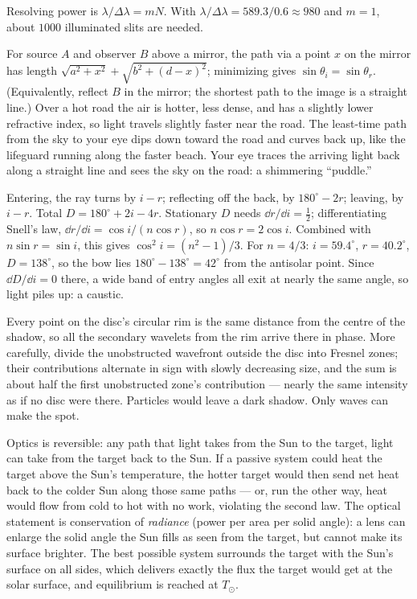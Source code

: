  Resolving power is $\lambda/\Delta\lambda = mN$. With $\lambda/\Delta\lambda = 589.3/0.6\approx980$ and $m = 1$, about $1000$ illuminated slits are needed.

 For source $A$ and observer $B$ above a mirror, the path via a point $x$ on the mirror has length $\sqrt{a^2+x^2} + \sqrt{b^2+(d-x)^2}$; minimizing gives $\sin\theta_i = \sin\theta_r$. (Equivalently, reflect $B$ in the mirror; the shortest path to the image is a straight line.) Over a hot road the air is hotter, less dense, and has a slightly lower refractive index, so light travels slightly faster near the road. The least-time path from the sky to your eye dips down toward the road and curves back up, like the lifeguard running along the faster beach. Your eye traces the arriving light back along a straight line and sees the sky on the road: a shimmering ``puddle.''

 Entering, the ray turns by $i - r$; reflecting off the back, by $180^\circ - 2r$; leaving, by $i - r$. Total $D = 180^\circ + 2i - 4r$. Stationary $D$ needs $\dd r/\dd i = \tfrac12$; differentiating Snell's law, $\dd r/\dd i = \cos i/(n\cos r)$, so $n\cos r = 2\cos i$. Combined with $n\sin r = \sin i$, this gives $\cos^2i = (n^2-1)/3$. For $n = 4/3$: $i = 59.4^\circ$, $r = 40.2^\circ$, $D = 138^\circ$, so the bow lies $180^\circ - 138^\circ = 42^\circ$ from the antisolar point. Since $\dd D/\dd i = 0$ there, a wide band of entry angles all exit at nearly the same angle, so light piles up: a caustic.

 Every point on the disc's circular rim is the same distance from the centre of the shadow, so all the secondary wavelets from the rim arrive there in phase. More carefully, divide the unobstructed wavefront outside the disc into Fresnel zones; their contributions alternate in sign with slowly decreasing size, and the sum is about half the first unobstructed zone's contribution --- nearly the same intensity as if no disc were there. Particles would leave a dark shadow. Only waves can make the spot.

 Optics is reversible: any path that light takes from the Sun to the target, light can take from the target back to the Sun. If a passive system could heat the target above the Sun's temperature, the hotter target would then send net heat back to the colder Sun along those same paths --- or, run the other way, heat would flow from cold to hot with no work, violating the second law. The optical statement is conservation of \emph{radiance} (power per area per solid angle): a lens can enlarge the solid angle the Sun fills as seen from the target, but cannot make its surface brighter. The best possible system surrounds the target with the Sun's surface on all sides, which delivers exactly the flux the target would get at the solar surface, and equilibrium is reached at $T_\odot$.
